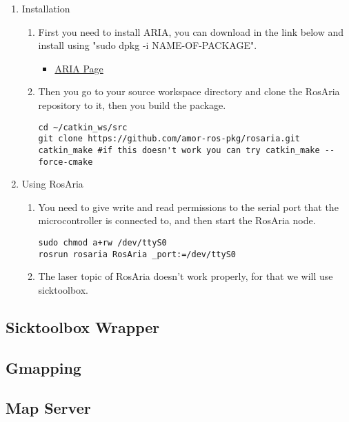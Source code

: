\documentclass{article}
\begin{document}
\begin{enumerate}
\item Installation
\begin{enumerate}

\item First you need to install ARIA, you can download in the link below and
install using "sudo dpkg -i NAME-OF-PACKAGE".
\begin{itemize}
\item \href{http://robots.mobilerobots.com/wiki/ARIA}{ARIA Page}
\end{itemize}

\item Then you go to your source workspace directory and clone the RosAria
repository to it, then you build the package.
\begin{lstlisting}
cd ~/catkin_ws/src
git clone https://github.com/amor-ros-pkg/rosaria.git
catkin_make #if this doesn't work you can try catkin_make --force-cmake
\end{lstlisting}
\end{enumerate}

\item Using RosAria
\begin{enumerate}

\item You need to give write and read permissions to the serial port that the
microcontroller is connected to, and then start the RosAria node.
\begin{lstlisting}
sudo chmod a+rw /dev/ttyS0
rosrun rosaria RosAria _port:=/dev/ttyS0
\end{lstlisting}
\item The laser topic of RosAria doesn't work properly, for that we will use
sicktoolbox.

\end{enumerate}
\end{enumerate}

\subsection{Sicktoolbox Wrapper}

\subsection{Gmapping}

\subsection{Map Server}
\end{document}
